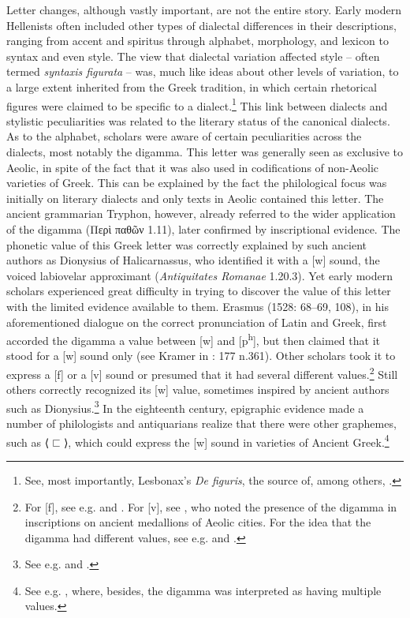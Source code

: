 Letter changes, although vastly important, are not the entire story. Early modern Hellenists often included other types of dialectal differences in their descriptions, ranging from accent and spiritus through alphabet, morphology, and lexicon to syntax and even style. The view that dialectal variation affected style – often termed \textit{syntaxis figurata} – was, much like ideas about other levels of variation, to a large extent inherited from the Greek tradition, in which certain rhetorical figures were claimed to be specific to a dialect.\footnote{{See, most importantly, Lesbonax’s} {\textit{De figuris}}{, the source of, among others, \citet[145--146]{Saumaise1643a}.}} This link between dialects and stylistic peculiarities was related to the literary status of the canonical dialects. As to the alphabet, scholars were aware of certain peculiarities across the dialects, most notably the digamma. This letter was generally seen as exclusive to Aeolic, in spite of the fact that it was also used in codifications of non-Aeolic varieties of Greek. This can be explained by the fact the philological focus was initially on literary dialects and only texts in Aeolic contained this letter. The ancient grammarian Tryphon, however, already referred to the wider application of the digamma (Περὶ παθῶν 1.11), later confirmed by inscriptional evidence. The phonetic value of this Greek letter was correctly explained by such ancient authors as Dionysius of Halicarnassus, who identified it with a [w] sound, the voiced labiovelar approximant (\textit{Antiquitates Romanae} 1.20.3). Yet early modern scholars experienced great difficulty in trying to discover the value of this letter with the limited evidence available to them. Erasmus (1528: 68–69, 108), in his aforementioned dialogue on the correct pronunciation of Latin and Greek, first accorded the digamma a value between [w] and [p\textsuperscript{h}], but then claimed that it stood for a [w] sound only (see Kramer in \citealt{Erasmus1978}: 177 n.361). Other scholars took it to express a [f] or a [v] sound or presumed that it had several different values.\footnote{{For [f], see e.g. \citet[4]{Sylvius1531} and \citet[5]{Rhenius1626}. For [v], see \citet[108-109]{Freret1809}, who noted the presence of the digamma in inscriptions on ancient medallions of Aeolic cities. For the idea that the digamma had different values, see e.g. \citet[107-108]{Canini1555} and \citet[b.1{\textsc{\textsuperscript{r}}}{–b.2}{\textsc{\textsuperscript{v}}}]{ThryllitschBrunner1709}.}} Still others correctly recognized its [w] value, sometimes inspired by ancient authors such as Dionysius.\footnote{{See e.g. \citet[b.4{\textsc{\textsuperscript{r}}}]{KirchmaierCrusius1684} and \citet[19]{Reynolds1752}.}} In the eighteenth century, epigraphic evidence made a number of philologists and antiquarians realize that there were other graphemes, such as ⟨$⊏$⟩, which could express the [w] sound in varieties of Ancient Greek.\footnote{{See e.g. \citet[128-130]{Mazzocchi1754}, where, besides, the digamma was interpreted as having multiple values.}}



